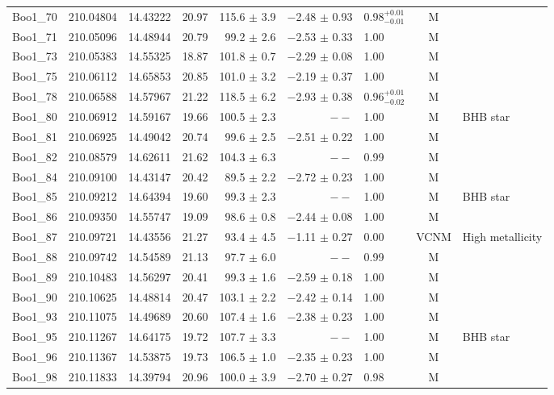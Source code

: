 \begin{table*}[t]
\begin{tabular}{lllrrrlcl}
Boo1\_70 & 210.04804 & 14.43222 & 20.97 & 115.6  $\pm$ 3.9 & $-$2.48  $\pm$ 0.93 & 0.98$^{+0.01}_{-0.01}$ & M & \\ 
Boo1\_71 & 210.05096 & 14.48944 & 20.79 & 99.2  $\pm$ 2.6 & $-$2.53  $\pm$ 0.33 & 1.00 & M & \\ 
Boo1\_73 & 210.05383 & 14.55325 & 18.87 & 101.8  $\pm$ 0.7 & $-$2.29  $\pm$ 0.08 & 1.00 & M & \\ 
Boo1\_75 & 210.06112 & 14.65853 & 20.85 & 101.0  $\pm$ 3.2 & $-$2.19  $\pm$ 0.37 & 1.00 & M & \\ 
Boo1\_78 & 210.06588 & 14.57967 & 21.22 & 118.5  $\pm$ 6.2 & $-$2.93  $\pm$ 0.38 & 0.96$^{+0.01}_{-0.02}$ & M & \\ 
Boo1\_80 & 210.06912 & 14.59167 & 19.66 & 100.5  $\pm$ 2.3 & $--$  & 1.00 & M & BHB star\\ 
Boo1\_81 & 210.06925 & 14.49042 & 20.74 & 99.6  $\pm$ 2.5 & $-$2.51  $\pm$ 0.22 & 1.00 & M & \\ 
Boo1\_82 & 210.08579 & 14.62611 & 21.62 & 104.3  $\pm$ 6.3 & $--$  & 0.99 & M & \\ 
Boo1\_84 & 210.09100 & 14.43147 & 20.42 & 89.5  $\pm$ 2.2 & $-$2.72  $\pm$ 0.23 & 1.00 & M & \\ 
Boo1\_85 & 210.09212 & 14.64394 & 19.60 & 99.3  $\pm$ 2.3 & $--$  & 1.00 & M & BHB star\\ 
Boo1\_86 & 210.09350 & 14.55747 & 19.09 & 98.6  $\pm$ 0.8 & $-$2.44  $\pm$ 0.08 & 1.00 & M & \\ 
Boo1\_87 & 210.09721 & 14.43556 & 21.27 & 93.4  $\pm$ 4.5 & $-$1.11  $\pm$ 0.27 & 0.00 & VCNM & High metallicity\\ 
Boo1\_88 & 210.09742 & 14.54589 & 21.13 & 97.7  $\pm$ 6.0 & $--$  & 0.99 & M & \\ 
Boo1\_89 & 210.10483 & 14.56297 & 20.41 & 99.3  $\pm$ 1.6 & $-$2.59  $\pm$ 0.18 & 1.00 & M & \\ 
Boo1\_90 & 210.10625 & 14.48814 & 20.47 & 103.1  $\pm$ 2.2 & $-$2.42  $\pm$ 0.14 & 1.00 & M & \\ 
Boo1\_93 & 210.11075 & 14.49689 & 20.60 & 107.4  $\pm$ 1.6 & $-$2.38  $\pm$ 0.23 & 1.00 & M & \\ 
Boo1\_95 & 210.11267 & 14.64175 & 19.72 & 107.7  $\pm$ 3.3 & $--$  & 1.00 & M & BHB star\\ 
Boo1\_96 & 210.11367 & 14.53875 & 19.73 & 106.5  $\pm$ 1.0 & $-$2.35  $\pm$ 0.23 & 1.00 & M & \\ 
Boo1\_98 & 210.11833 & 14.39794 & 20.96 & 100.0  $\pm$ 3.9 & $-$2.70  $\pm$ 0.27 & 0.98 & M & \\ 

\end{tabular}
\end{table*}
